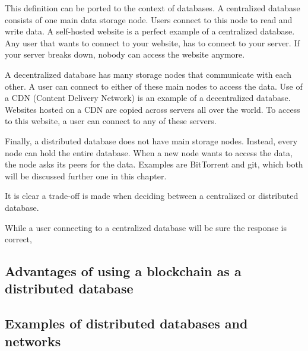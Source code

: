 This definition can be ported to the context of databases. A centralized database consists of one main data storage node. Users connect to this node to read and write data. A self-hosted website is a perfect example of a centralized database. Any user that wants to connect to your website, has to connect to your server. If your server breaks down, nobody can access the website anymore.

A decentralized database has many storage nodes that communicate with each other. A user can connect to either of these main nodes to access the data. Use of a CDN (Content Delivery Network) is an example of a decentralized database. Websites hosted on a CDN are copied across servers all over the world. To access to this website, a user can connect to any of these servers.

Finally, a distributed database does not have main storage nodes. Instead, every node can hold the entire database. When a new node wants to access the data, the node asks its peers for the data. Examples are BitTorrent and git, which both will be discussed further one in this chapter.

It is clear a trade-off is made when deciding between a centralized or distributed database. 

While a user connecting to a centralized database will be sure the response is correct, 




\subsection{Advantages of using a blockchain as a distributed database}

\subsection{Examples of distributed databases and networks}

